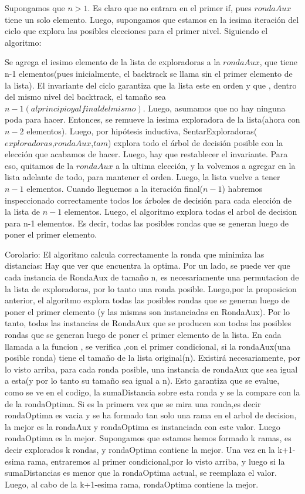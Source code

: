 \documentclass[10pt, a4paper]{article}
\begin{document}
Supongamos que $n> 1$.  Es claro que no entrara en el primer if, pues $rondaAux$ tiene un solo elemento. Luego, supongamos que estamos en la iesima iteración del ciclo que explora las posibles elecciones para el primer nivel. Siguiendo el algoritmo: 

Se agrega el iesimo elemento de la lista de exploradoras a la $rondaAux$, que tiene n-1 elementos(pues inicialmente, el backtrack se llama  sin el primer elemento de la lista). El invariante del ciclo garantiza que la lista este en orden y que , dentro del mismo nivel del backtrack, el tamaño sea $n-1(al principio y al final del mismo)$. Luego, asumamos que no hay ninguna poda para hacer. Entonces, se remueve la iesima exploradora de la lista(ahora con $n-2$ elementos). Luego, por hipótesis inductiva, SentarExploradoras($exploradoras$,$rondaAux$,$tam$) explora todo el árbol de decisión posible con la elección que acabamos de hacer. Luego, hay que restablecer el invariante. Para eso, quitamos de la $rondaAux$ a la ultima elección, y la volvemos a agregar en la lista adelante de todo, para mantener el orden. Luego, la lista vuelve a tener $n-1$ elementos. Cuando lleguemos a la iteración final($n-1$) habremos inspeccionado correctamente todos los árboles de decisión para cada elección de la lista de $n-1$ elementos. Luego, el algoritmo explora todas el arbol de decision para n-1 elementos. Es decir, todas las posibles rondas que se generan luego de poner el primer elemento.

Corolario: El algoritmo calcula correctamente la ronda que minimiza las distancias:
Hay que ver que encuentra la optima.
Por un lado, se puede ver que cada instancia de RondaAux de tamaño n,  es necesariamente una permutacion de la lista de exploradoras, por lo tanto una ronda posible. 
Luego,por la proposicion anterior, el algoritmo explora todas las posibles rondas que se generan luego de poner el primer elemento (y las mismas son instanciadas en RondaAux).
Por lo tanto, todas las instancias de RondaAux que se producen son todas las posibles rondas que se generan luego de poner el primer elemento de la lista.
En cada llamada a la funcion , se verifica ,con el primer condicional, si la rondaAux(una posible ronda) tiene el tamaño de la lista original(n). Existirá necesariamente, por lo visto arriba,  para cada ronda posible, una instancia de rondaAux que sea igual a esta(y por lo tanto su tamaño sea igual a n). Esto garantiza que se evalue, como se ve en el codigo, la sumaDistancia sobre esta ronda y se la compare con la de la  rondaOptima.
Si es la primera vez que se mira una ronda,es decir rondaOptima es vacia y se ha formado tan solo una rama en el arbol de decision, la mejor es la rondaAux y rondaOptima es instanciada con este valor. Luego rondaOptima es la mejor.
Supongamos que estamos hemos formado k ramas, es decir explorados k rondas, y rondaOptima contiene la mejor. Una vez en la k+1-esima rama, entraremos al primer condicional,por lo visto arriba, y luego si la sumaDistancias es menor que la rondaOptima actual, se reemplaza el valor. Luego, al cabo de la k+1-esima rama, rondaOptima contiene la mejor.
\end{document}
